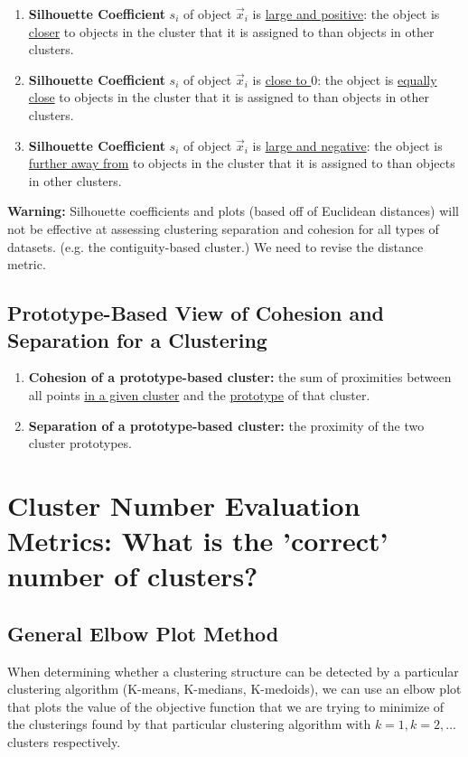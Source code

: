 \documentclass[11pt]{elegantbook}
\begin{document}
\begin{enumerate}
    \item \textbf{Silhouette Coefficient} $s_i$ of object $\vec{x}_i$ is \underline{large and positive}: the object is \underline{closer} to objects in the cluster that it is assigned to than objects in other clusters.
    \item \textbf{Silhouette Coefficient} $s_i$ of object $\vec{x}_i$ is \underline{close to $0$}: the object is \underline{equally close} to objects in the cluster that it is assigned to than objects in other clusters.
    \item \textbf{Silhouette Coefficient} $s_i$ of object $\vec{x}_i$ is \underline{large and negative}: the object is \underline{further away from} to objects in the cluster that it is assigned to than objects in other clusters.
\end{enumerate}
\textbf{Warning:} Silhouette coefficients and plots (based off of Euclidean distances) will not be effective at assessing clustering separation and cohesion for all types of datasets. (e.g. the contiguity-based cluster.) We need to revise the distance metric.

\subsection{Prototype-Based View of Cohesion and Separation for a Clustering}
\begin{enumerate}
    \item \textbf{Cohesion of a prototype-based cluster:} the sum of proximities between all points \underline{in a given cluster} and the \underline{prototype} of that cluster.
    \item \textbf{Separation of a prototype-based cluster:} the proximity of the two cluster prototypes.
\end{enumerate}


\section{Cluster Number Evaluation Metrics: What is the 'correct' number of clusters?}

\subsection{General Elbow Plot Method}
\begin{definition}
    When determining whether a clustering structure can be detected by a particular clustering algorithm (K-means, K-medians, K-medoids), we can use an elbow plot that plots the value of the objective function that we are trying to minimize of the clusterings found by that particular clustering algorithm with $k=1,k=2,...$ clusters respectively.
\end{definition}
\end{document}
